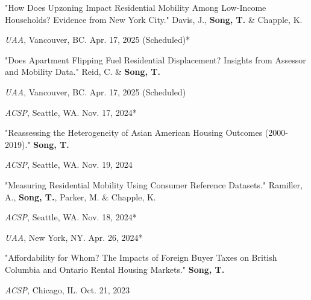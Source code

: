 \documentclass[12pt,letterpaper]{report}
\newcommand{\listitemspace}{0.4em}
\renewenvironment{itemize}
{\begin{list}{}{\setlength{\leftmargin}{0.5em}
                \setlength{\parskip}{0em}
                \setlength{\itemsep}{\listitemspace}
                \setlength{\parsep}{\listitemspace}}}
{\end{list}}
\begin{document}
\begin{itemize}
  \setlength{\itemsep}{-0.0em}  %
  
  \item "How Does Upzoning Impact Residential Mobility Among Low-Income Households? Evidence from New York City." Davis, J., \textbf{Song, T.} \& Chapple, K.
    \begin{itemize}
      \addtolength{\leftskip}{2em} 
      \setlength{\itemsep}{-0.4em}
      \item[•] \emph{UAA}, Vancouver, BC. Apr. 17, 2025 (Scheduled)*
    \end{itemize}

  \item "Does Apartment Flipping Fuel Residential Displacement? Insights from Assessor and Mobility Data." Reid, C. \& \textbf{Song, T.} 
    \begin{itemize}
      \addtolength{\leftskip}{2em} 
      \setlength{\itemsep}{-0.4em}
      \item[•] \emph{UAA}, Vancouver, BC. Apr. 17, 2025 (Scheduled)
      \item[•] \emph{ACSP}, Seattle, WA. Nov. 17, 2024*
    \end{itemize}

  \item "Reassessing the Heterogeneity of Asian American Housing Outcomes (2000-2019)." \textbf{Song, T.} 
    \begin{itemize}
      \addtolength{\leftskip}{2em} 
      \setlength{\itemsep}{-0.4em}
      \item[•] \emph{ACSP}, Seattle, WA. Nov. 19, 2024
    \end{itemize}

  \item "Measuring Residential Mobility Using Consumer Reference Datasets." Ramiller, A., \textbf{Song, T.}, Parker, M. \& Chapple, K. 
  \begin{itemize}
      \addtolength{\leftskip}{2em} 
      \setlength{\itemsep}{-0.4em}
      \item[•] \emph{ACSP}, Seattle, WA. Nov. 18, 2024*
      \item[•] \emph{UAA}, New York, NY. Apr. 26, 2024*
  \end{itemize}

  \item "Affordability for Whom? The Impacts of Foreign Buyer Taxes on British Columbia and Ontario Rental Housing Markets." \textbf{Song, T.} 
  \begin{itemize}
      \addtolength{\leftskip}{2em} 
      \setlength{\itemsep}{-0.4em}
      \item[•] \emph{ACSP}, Chicago, IL. Oct. 21, 2023
  \end{itemize}


\end{itemize}
\end{document}
